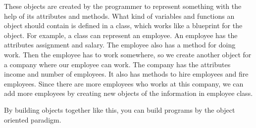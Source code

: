 \documentclass {article}
\begin{document}
These objects are created by the programmer to represent something with the help of its attributes and methods. What kind of variables and functions an object should contain is defined in a class, which works like a blueprint for the object. For example, a class can represent an employee. An employee has the attributes assignment and salary. The employee also has a method for doing work. Then the employee has to work somewhere, so we create another object for a company where our employee can work. The company has the attributes income and number of employees. It also has methods to hire employees and fire employees. Since there are more employees who works at this company, we can add more employees by creating new objects of the information in employee class.

By building objects together like this, you can build programs by the object oriented paradigm.  
\end{document}

